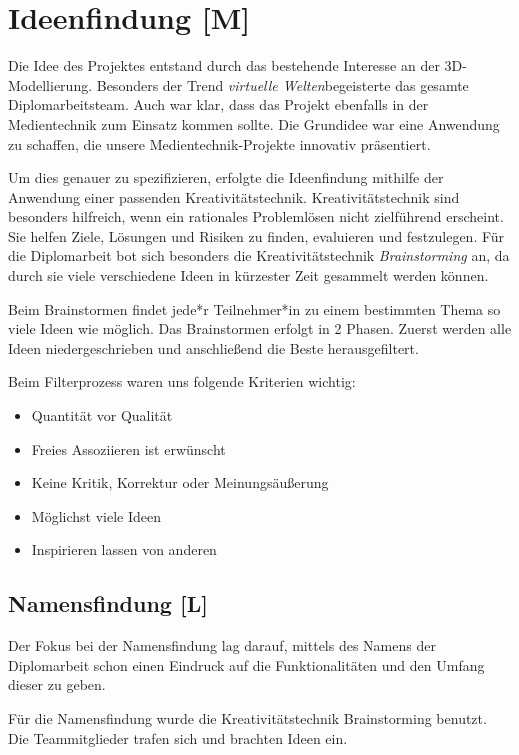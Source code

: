 
\section{Ideenfindung [M]}

Die Idee des Projektes entstand durch das bestehende Interesse an der 3D-Modellierung. Besonders der Trend \emph{virtuelle Welten}begeisterte das gesamte Diplomarbeitsteam. Auch war klar, dass das Projekt ebenfalls in der Medientechnik zum Einsatz kommen sollte. Die Grundidee war eine Anwendung zu schaffen, die unsere Medientechnik-Projekte innovativ präsentiert.

Um dies genauer zu spezifizieren, erfolgte die Ideenfindung mithilfe der Anwendung einer passenden Kreativitätstechnik. Kreativitätstechnik sind besonders hilfreich, wenn ein rationales Problemlösen nicht zielführend erscheint. Sie helfen Ziele, Lösungen und Risiken zu finden, evaluieren und festzulegen. Für die Diplomarbeit bot sich besonders die Kreativitätstechnik \emph{Brainstorming} an, da durch sie viele verschiedene Ideen in kürzester Zeit gesammelt werden können. \cite{Ideenfindung}

Beim Brainstormen findet jede*r Teilnehmer*in zu einem bestimmten Thema so viele Ideen wie möglich. Das Brainstormen erfolgt in 2 Phasen. Zuerst werden alle Ideen niedergeschrieben und anschließend die Beste herausgefiltert.  

Beim Filterprozess waren uns folgende Kriterien wichtig:
\begin{itemize}
    \item Quantität vor Qualität
    \item Freies Assoziieren ist erwünscht
    \item Keine Kritik, Korrektur oder Meinungsäußerung
    \item Möglichst viele Ideen
    \item Inspirieren lassen von anderen \cite{Ideenfindung}
\end{itemize}


\subsection{Namensfindung [L]}
Der Fokus bei der Namensfindung lag darauf, mittels des Namens der Diplomarbeit schon einen Eindruck auf die Funktionalitäten und den Umfang dieser zu geben.

Für die Namensfindung wurde die Kreativitätstechnik Brainstorming benutzt. Die Teammitglieder trafen sich und brachten Ideen ein.

